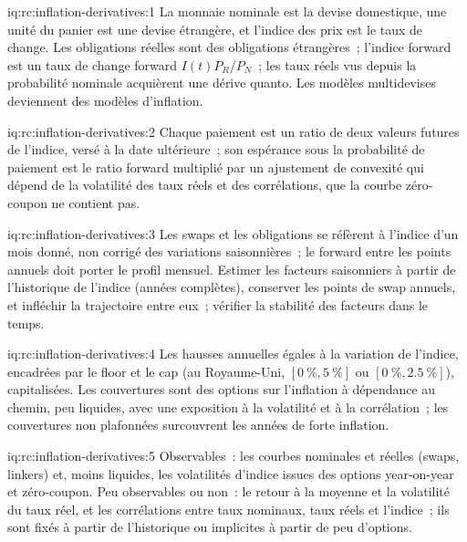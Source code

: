 \begin{solution}{iq:rc:inflation-derivatives:1}
La monnaie nominale est la devise domestique, une unité du panier est une devise étrangère, et
l'indice des prix est le taux de change. Les obligations réelles sont des obligations étrangères~; l'indice forward est
un taux de change forward $I(t)P_R/P_N$~; les taux réels vus depuis la probabilité nominale acquièrent une
dérive quanto. Les modèles multidevises deviennent des modèles d'inflation.
\end{solution}

\begin{solution}{iq:rc:inflation-derivatives:2}
Chaque paiement est un ratio de deux valeurs futures de l'indice, versé à la date ultérieure~; son
espérance sous la probabilité de paiement est le ratio forward multiplié par un ajustement de convexité
qui dépend de la volatilité des taux réels et des corrélations, que la courbe zéro-coupon ne
contient pas.
\end{solution}

\begin{solution}{iq:rc:inflation-derivatives:3}
Les swaps et les obligations se réfèrent à l'indice d'un mois donné, non corrigé des variations saisonnières~; le forward
entre les points annuels doit porter le profil mensuel. Estimer les facteurs saisonniers à partir de
l'historique de l'indice (années complètes), conserver les points de swap annuels, et infléchir la trajectoire entre eux~;
vérifier la stabilité des facteurs dans le temps.
\end{solution}

\begin{solution}{iq:rc:inflation-derivatives:4}
Les hausses annuelles égales à la variation de l'indice, encadrées par le floor et le cap (au Royaume-Uni, $[0~\%,5~\%]$ ou
$[0~\%,2.5~\%]$), capitalisées. Les couvertures sont des options sur l'inflation à dépendance au chemin, peu liquides, avec
une exposition à la volatilité et à la corrélation~; les couvertures non plafonnées surcouvrent les années de forte inflation.
\end{solution}

\begin{solution}{iq:rc:inflation-derivatives:5}
Observables~: les courbes nominales et réelles (swaps, linkers) et, moins liquides, les volatilités
d'indice issues des options year-on-year et zéro-coupon. Peu observables ou non~: le
retour à la moyenne et la volatilité du taux réel, et les corrélations entre taux nominaux, taux réels
et l'indice~; ils sont fixés à partir de l'historique ou implicites à partir de peu d'options.
\end{solution}

